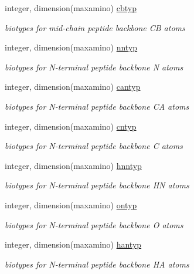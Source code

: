 \begin{DoxyCompactItemize}
integer, dimension(maxamino) \hyperlink{classresdue_a5c7194799b5b4c659a3e08ccf6a07a82}{cbtyp}
\begin{DoxyCompactList}\small\item\em biotypes for mid-\/chain peptide backbone C\-B atoms \end{DoxyCompactList}\item 
integer, dimension(maxamino) \hyperlink{classresdue_a82db5e55499ed18ed1d2f58bdf8e7312}{nntyp}
\begin{DoxyCompactList}\small\item\em biotypes for N-\/terminal peptide backbone N atoms \end{DoxyCompactList}\item 
integer, dimension(maxamino) \hyperlink{classresdue_a127824bfd508340fba9a479d0e23444e}{cantyp}
\begin{DoxyCompactList}\small\item\em biotypes for N-\/terminal peptide backbone C\-A atoms \end{DoxyCompactList}\item 
integer, dimension(maxamino) \hyperlink{classresdue_a61b1e7c7163ff480275984e367a3dffa}{cntyp}
\begin{DoxyCompactList}\small\item\em biotypes for N-\/terminal peptide backbone C atoms \end{DoxyCompactList}\item 
integer, dimension(maxamino) \hyperlink{classresdue_a186dccbe7c92c66436d7a74365ae8269}{hnntyp}
\begin{DoxyCompactList}\small\item\em biotypes for N-\/terminal peptide backbone H\-N atoms \end{DoxyCompactList}\item 
integer, dimension(maxamino) \hyperlink{classresdue_a2170a9a55ac22ff0c519b4026bb15fe6}{ontyp}
\begin{DoxyCompactList}\small\item\em biotypes for N-\/terminal peptide backbone O atoms \end{DoxyCompactList}\item 
integer, dimension(maxamino) \hyperlink{classresdue_a8b657c92c1c4475acb2dc5a11234653f}{hantyp}
\begin{DoxyCompactList}\small\item\em biotypes for N-\/terminal peptide backbone H\-A atoms \end{DoxyCompactList}\item 

\end{DoxyCompactItemize}
